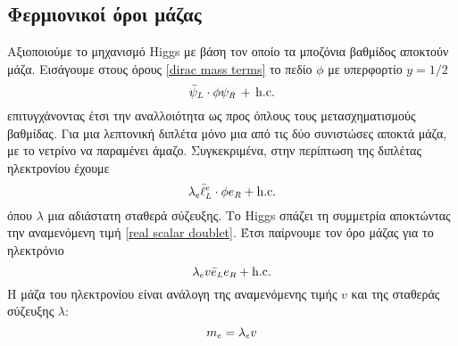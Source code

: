 \subsection{Φερμιονικοί όροι μάζας}\label{section mass for fermions}
Αξιοποιούμε το μηχανισμό Higgs με βάση τον οποίο τα μποζόνια βαθμίδος αποκτούν μάζα. Εισάγουμε στους όρους \eqref{dirac mass terms} το πεδίο $\phi$ με υπερφορτίο $y=1/2$
\begin{equation}
    \Bar{\psi}\subscr{L}\cdot\phi\psi\subscr{R} \,+\, \text{h.c.}
\end{equation}
επιτυγχάνοντας έτσι την αναλλοιότητα ως προς όπλους τους μετασχηματισμούς βαθμίδας. 
Για μια λεπτονική διπλέτα μόνο μια από τις δύο συνιστώσες αποκτά μάζα, με το νετρίνο να παραμένει άμαζο. 
Συγκεκριμένα, στην περίπτωση της διπλέτας ηλεκτρονίου έχουμε
\begin{equation}
    \lambda\subscr{e}\Bar{\ell}\subscr{L}\superscr{e}\cdot\phi e\subscr{R} + \text{h.c.}
\end{equation}
όπου $\lambda$ μια αδιάστατη σταθερά σύζευξης. Το Higgs σπάζει τη συμμετρία αποκτώντας την αναμενόμενη τιμή \eqref{real scalar doublet}. Έτσι παίρνουμε τον όρο μάζας για το ηλεκτρόνιο
\begin{equation}
    \lambda\subscr{e}v\Bar{e}\subscr{L}e\subscr{R} + \text{h.c.}
\end{equation}
Η μάζα του ηλεκτρονίου είναι ανάλογη της αναμενόμενης τιμής $v$ και της σταθεράς σύζευξης $\lambda$:
\begin{equation}
    m\subscr{e}=\lambda\subscr{e}v
\end{equation}